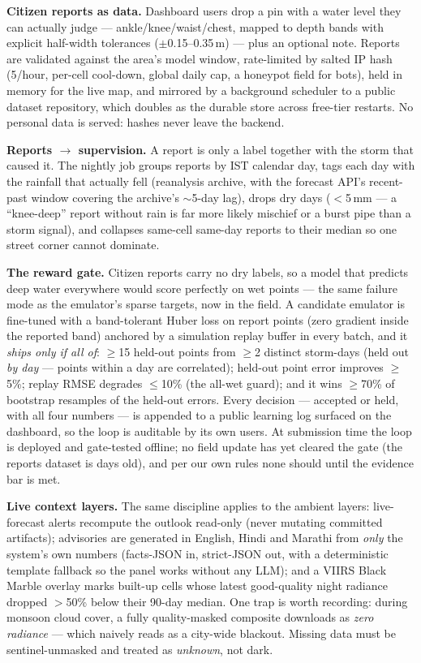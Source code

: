 \documentclass[10pt]{article}
\begin{document}
\textbf{Citizen reports as data.} Dashboard users drop a pin with a water level they can actually
judge --- ankle/knee/waist/chest, mapped to depth bands with explicit half-width tolerances
($\pm$0.15--0.35\,m) --- plus an optional note. Reports are validated against the area's model
window, rate-limited by salted IP hash (5/hour, per-cell cool-down, global daily cap, a honeypot
field for bots), held in memory for the live map, and mirrored by a background scheduler to a
public dataset repository, which doubles as the durable store across free-tier restarts. No
personal data is served: hashes never leave the backend.

\textbf{Reports $\to$ supervision.} A report is only a label together with the storm that caused
it. The nightly job groups reports by IST calendar day, tags each day with the rainfall that
actually fell (reanalysis archive, with the forecast API's recent-past window covering the
archive's $\sim$5-day lag), drops dry days ($<$5\,mm --- a ``knee-deep'' report without rain is far
more likely mischief or a burst pipe than a storm signal), and collapses same-cell same-day reports
to their median so one street corner cannot dominate.

\textbf{The reward gate.} Citizen reports carry no dry labels, so a model that predicts deep water
everywhere would score perfectly on wet points --- the same failure mode as the emulator's sparse
targets, now in the field. A candidate emulator is fine-tuned with a band-tolerant Huber loss on
report points (zero gradient inside the reported band) anchored by a simulation replay buffer in
every batch, and it \emph{ships only if all of}: $\ge$15 held-out points from $\ge$2 distinct
storm-days (held out \emph{by day} --- points within a day are correlated); held-out point error
improves $\ge$5\%; replay RMSE degrades $\le$10\% (the all-wet guard); and it wins $\ge$70\% of
bootstrap resamples of the held-out errors. Every decision --- accepted or held, with all four
numbers --- is appended to a public learning log surfaced on the dashboard, so the loop is
auditable by its own users. At submission time the loop is deployed and gate-tested offline; no
field update has yet cleared the gate (the reports dataset is days old), and per our own rules
none should until the evidence bar is met.

\textbf{Live context layers.} The same discipline applies to the ambient layers: live-forecast
alerts recompute the outlook read-only (never mutating committed artifacts); advisories are
generated in English, Hindi and Marathi from \emph{only} the system's own numbers (facts-JSON in,
strict-JSON out, with a deterministic template fallback so the panel works without any LLM); and a
VIIRS Black Marble \citep{roman2018} overlay marks built-up cells whose latest good-quality night
radiance dropped $>$50\% below their 90-day median. One trap is worth recording: during monsoon
cloud cover, a fully quality-masked composite downloads as \emph{zero radiance} --- which naively
reads as a city-wide blackout. Missing data must be sentinel-unmasked and treated as
\emph{unknown}, not dark.
\end{document}
